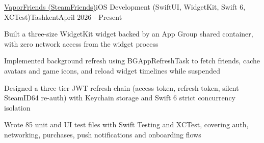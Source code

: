 \begin{resume_employer}{\href{https://apps.apple.com/us/app/vaporfriends/id6762462173}{VaporFriends (SteamFriends)}}{iOS Development (SwiftUI, WidgetKit, Swift 6, XCTest)}{Tashkent}{April 2026 - Present}
\item Built a three-size WidgetKit widget backed by an App Group shared container, with zero network access from the widget process
\item Implemented background refresh using BGAppRefreshTask to fetch friends, cache avatars and game icons, and reload widget timelines while suspended
\item Designed a three-tier JWT refresh chain (access token, refresh token, silent SteamID64 re-auth) with Keychain storage and Swift 6 strict concurrency isolation
\item Wrote 85 unit and UI test files with Swift Testing and XCTest, covering auth, networking, purchases, push notifications and onboarding flows
\end{resume_employer}
